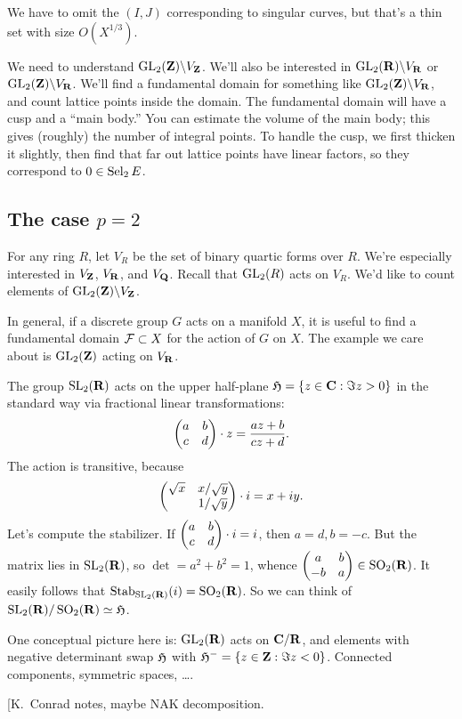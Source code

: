 We have to omit the $(I,J)$ corresponding to singular curves, but that's a 
thin set with size $O(X^{1/3})$. 

We need to understand $\operatorname{GL}_2(\mathbf{Z})\backslash V_{\mathbf{Z}}$. We'll also be 
interested in $\operatorname{GL}_2(\mathbf{R})\backslash V_{\mathbf{R}}$ or $\operatorname{GL}_2(\mathbf{Z})\backslash V_{\mathbf{R}}$. 
We'll find a fundamental domain for something like 
$\operatorname{GL}_2(\mathbf{Z})\backslash V_{\mathbf{R}}$, and count lattice points inside the domain. 
The fundamental domain will have a cusp and a ``main body.'' You can estimate 
the volume of the main body; this gives (roughly) the number of integral 
points. To handle the cusp, we first thicken it slightly, then find that 
far out lattice points have linear factors, so they correspond to 
$0\in \operatorname{Sel}_2 E$. 





\subsection{The case \texorpdfstring{$p=2$}{p=2}}

For any ring $R$, let $V_R$ be the set of binary quartic forms over $R$. 
We're especially interested in $V_{\mathbf{Z}}$, $V_{\mathbf{R}}$, and $V_{\mathbf{Q}}$. Recall that 
$\operatorname{GL}_2(R)$ acts on $V_R$. We'd like to count elements of 
$\operatorname{GL}_2(\mathbf{Z})\backslash V_{\mathbf{Z}}$. 

In general, if a discrete group $G$ acts on a manifold $X$, it is useful to 
find a fundamental domain $\mathcal{F}\subset X$ for the action of $G$ on $X$. The 
example we care about is $\operatorname{GL}_2(\mathbf{Z})$ acting on $V_{\mathbf{R}}$. 

The group $\operatorname{SL}_2(\mathbf{R})$ acts on the upper half-plane $\mathfrak{H}=\{z\in \mathbf{C}:\Im z>0\}$ 
in the standard way via fractional linear transformations:
\[
  \begin{pmatrix} a & b \\ c & d \end{pmatrix}\cdot z = \frac{a z+b}{c z+d} .
\]
The action is transitive, because 
\[
  \begin{pmatrix} \sqrt x & x/\sqrt y \\  & 1/\sqrt y \end{pmatrix}\cdot i = x+i y .
\]
Let's compute the stabilizer. If $\begin{pmatrix} a & b \\ c & d \end{pmatrix}\cdot i=i$, then 
$a=d,b=-c$. But the matrix lies in $\operatorname{SL}_2(\mathbf{R})$, so 
$\det=a^2+b^2=1$, whence $\begin{pmatrix} a & b \\ -b & a \end{pmatrix}\in \operatorname{SO}_2(\mathbf{R})$. It easily follows 
that $\operatorname{Stab}_{\operatorname{SL}_2(\mathbf{R})}(i) = \operatorname{SO}_2(\mathbf{R})$. So we can think of 
$\operatorname{SL}_2(\mathbf{R})/\operatorname{SO}_2(\mathbf{R})\simeq \mathfrak{H}$. 

One conceptual picture here is: $\operatorname{GL}_2(\mathbf{R})$ acts on $\mathbf{C}/\mathbf{R}$, and elements 
with negative determinant swap $\mathfrak{H}$ with $\mathfrak{H}^-=\{z\in \mathbf{Z}:\Im z<0\}$. 
Connected components, symmetric spaces, \ldots. 

[K.~Conrad notes, maybe NAK decomposition.

